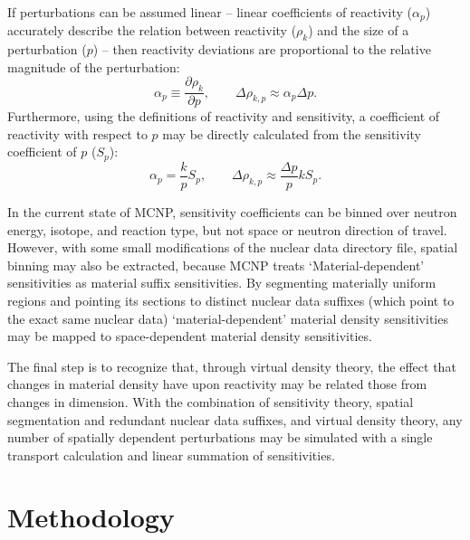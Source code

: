\documentclass[10pt]{article}
\begin{document}
If perturbations can be assumed linear -- linear coefficients of reactivity ($\alpha_p$) accurately describe the relation between reactivity ($\rho_k$) and the size of a perturbation ($p$) -- then reactivity deviations are proportional to the relative magnitude of the perturbation:
\begin{equation}
    \alpha_p
    \equiv \frac{\partial\rho_k}{\partial p}
    , \qquad
    \Delta\rho_{k,p}
    \approx \alpha_p \Delta p
    .
\end{equation}
Furthermore, using the definitions of reactivity and sensitivity, a coefficient of reactivity with respect to $p$ may be directly calculated from the sensitivity coefficient of $p$ ($S_p$):
\begin{equation}
    \label{eqn:essToRho}
    \alpha_p
    = \frac{k}{p} S_p
    , \qquad
    \Delta\rho_{k,p}
    \approx 
    \frac{\Delta p}{p} k S_p
    .
\end{equation}

In the current state of MCNP, sensitivity coefficients can be binned over neutron energy, isotope, and reaction type, but not space or neutron direction of travel.
However, with some small modifications of the nuclear data directory file, spatial binning may also be extracted, because MCNP treats `Material-dependent' sensitivities as material suffix sensitivities.
By segmenting materially uniform regions and pointing its sections to distinct nuclear data suffixes (which point to the exact same nuclear data) `material-dependent' material density sensitivities may be mapped to space-dependent material density sensitivities.

The final step is to recognize that, through virtual density theory, the effect that changes in material density have upon reactivity may be related those from changes in dimension.
With the combination of sensitivity theory, spatial segmentation and redundant nuclear data suffixes, and virtual density theory, any number of spatially dependent perturbations may be simulated with a single transport calculation and linear summation of sensitivities.

\section{ Methodology }
\end{document}
